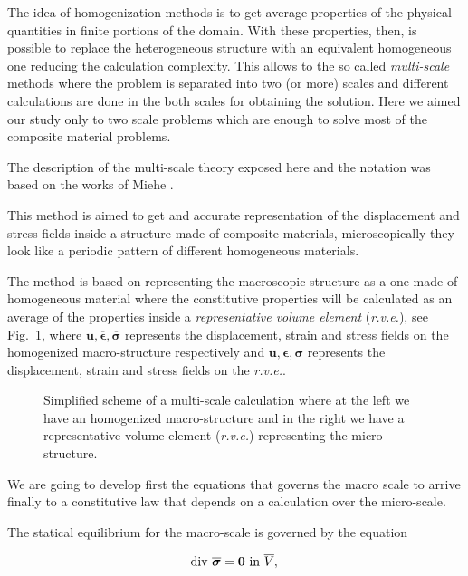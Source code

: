 \documentclass[review]{elsarticle}
\begin{document}
The idea of homogenization methods is to get average properties of the physical
quantities in finite portions of the domain. With these properties, then, is 
possible to replace the heterogeneous structure with an equivalent homogeneous
one reducing the calculation complexity. This allows to the so called
\emph{multi-scale} methods where the problem is separated into two (or more)
scales and different calculations are done in the both scales
for obtaining the solution. Here we aimed our study only to two scale problems
which are enough to solve most of the composite material problems.

The description of the multi-scale theory exposed here and the 
notation was based on the works of Miehe \cite{miehe2002}.

This method is aimed to get and accurate representation of the displacement 
and stress fields inside a structure made of composite materials, microscopically
they look like a periodic pattern of different homogeneous materials.

The method is based on representing the macroscopic structure as a one made of 
homogeneous material where the constitutive properties will be calculated as an 
average of the properties inside a \emph{representative volume element} (\emph{r.v.e.}),
see Fig.~\ref{fig:multi-scale}, where 
$\overline{\bm{u}}, \overline{\bm{\epsilon}}, \overline{\bm{\sigma}}$
represents the displacement, strain and stress fields on the homogenized
macro-structure respectively and
${\bm{u}}, {\bm{\epsilon}}, {\bm{\sigma}}$
represents the displacement, strain and stress fields on the \emph{r.v.e.}.

\begin{figure}[!ht]
\resizebox{8cm}{!}{}
\caption{\label{fig:multi-scale}Simplified scheme of a multi-scale calculation 
where at the left we have an homogenized macro-structure and 
in the right we have a representative volume element (\emph{r.v.e.}) 
representing the micro-structure.}
\end{figure}

We are going to develop first the equations that governs the macro scale
to arrive finally to a constitutive law that depends on a calculation over the
micro-scale.

The statical equilibrium for the macro-scale is governed by the equation

\begin{equation}
\text{div } \overline{\bm{\sigma}} = \bm{0} \text{ in } \overline{V},\\
\label{eq:macro_equil}
\end{equation}
\end{document}
